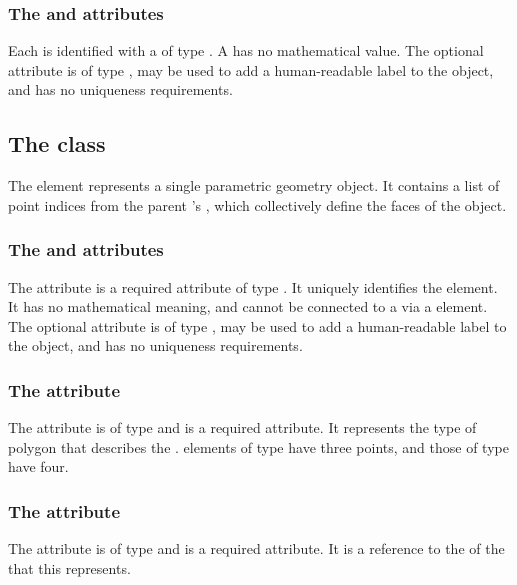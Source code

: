 \begin{blockChanged}
\subsubsection{The \fixttspace{} and \fixttspace{} attributes}
Each \SpatialPoints is identified with a  of type .  A \SpatialPoints has no mathematical value.  The optional  attribute is of type , may be used to add a human-readable label to the object, and has no uniqueness requirements.
\end{blockChanged}


\subsection{The  class}
\label{parametricobject-class}
The \ParametricObject element represents a single parametric geometry object.  It contains a list of point indices from the parent \ParametricGeometry's \SpatialPoints, which collectively define the faces of the object.

\subsubsection{The \fixttspace{} and \fixttspace{} attributes}
The  attribute is a required attribute of type . It uniquely identifies the \ParametricObject element.  It has no mathematical meaning, and cannot be connected to a \Parameter via a \SpatialSymbolReference element.  The optional  attribute is of type , may be used to add a human-readable label to the object, and has no uniqueness requirements.

\subsubsection{The \fixttspace{} attribute}
The  attribute is of type  and is a required attribute. It represents the type of polygon that describes the \ParametricObject.  \ParametricObject elements of type  have three points, and those of type  have four.

\subsubsection{The \fixttspace{} attribute}
The  attribute is of type  and is a required attribute. It is a reference to the  of the \DomainType that this \ParametricObject represents.

